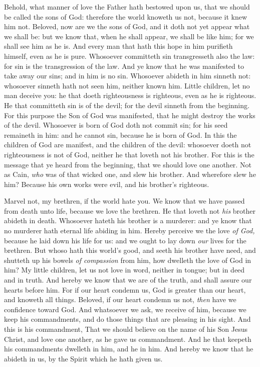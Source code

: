 \documentclass[11pt,letterpaper,oneside]{memoir}
\begin{document}
Behold, what manner of love the Father hath bestowed upon us, that we
should be called the sons of God: therefore the world knoweth us not,
because it knew him not. Beloved, now are we the sons of God, and it
doth not yet appear what we shall be: but we know that, when he shall
appear, we shall be like him; for we shall see him as he is. And every
man that hath this hope in him purifieth himself, even as he is pure.
Whosoever committeth sin transgresseth also the law: for sin is the
transgression of the law. And ye know that he was manifested to take
away our sins; and in him is no sin. Whosoever abideth in him sinneth
not: whosoever sinneth hath not seen him, neither known him. Little
children, let no man deceive you: he that doeth righteousness is
righteous, even as he is righteous. He that committeth sin is of the
devil; for the devil sinneth from the beginning. For this purpose the
Son of God was manifested, that he might destroy the works of the devil.
Whosoever is born of God doth not commit sin; for his seed remaineth in
him: and he cannot sin, because he is born of God. In this the children
of God are manifest, and the children of the devil: whosoever doeth not
righteousness is not of God, neither he that loveth not his brother. For
this is the message that ye heard from the beginning, that we should
love one another. Not as Cain, \emph{who} was of that wicked one, and
slew his brother. And wherefore slew he him? Because his own works were
evil, and his brother's righteous.

Marvel not, my brethren, if the world hate you. We know that we have
passed from death unto life, because we love the brethren. He that
loveth not \emph{his} brother abideth in death. Whosoever hateth his
brother is a murderer: and ye know that no murderer hath eternal life
abiding in him. Hereby perceive we the love \emph{of God,} because he
laid down his life for us: and we ought to lay down \emph{our} lives for
the brethren. But whoso hath this world's good, and seeth his brother
have need, and shutteth up his bowels \emph{of compassion} from him, how
dwelleth the love of God in him? My little children, let us not love in
word, neither in tongue; but in deed and in truth. And hereby we know
that we are of the truth, and shall assure our hearts before him. For if
our heart condemn us, God is greater than our heart, and knoweth all
things. Beloved, if our heart condemn us not, \emph{then} have we
confidence toward God. And whatsoever we ask, we receive of him, because
we keep his commandments, and do those things that are pleasing in his
sight. And this is his commandment, That we should believe on the name
of his Son Jesus Christ, and love one another, as he gave us
commandment. And he that keepeth his commandments dwelleth in him, and
he in him. And hereby we know that he abideth in us, by the Spirit which
he hath given us.
\end{document}
